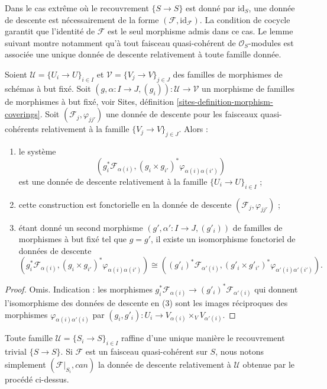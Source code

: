 \medskip\noindent
Dans le cas extrême où le recouvrement $\{S \to S\}$ est donné par
$\text{id}_S$, une donnée de descente est nécessairement de la forme
$(\mathcal{F}, \text{id}_\mathcal{F})$. La condition de cocycle garantit que
l'identité de $\mathcal{F}$ est le seul morphisme admis dans ce cas. Le lemme
suivant montre notamment qu'à tout faisceau quasi-cohérent de
$\mathcal{O}_S$-modules est associée une unique donnée de descente relativement
à toute famille donnée.

\begin{lemma}
\label{lemma-refine-descent-datum}
Soient $\mathcal{U} = \{U_i \to U\}_{i \in I}$ et
$\mathcal{V} = \{V_j \to V\}_{j \in J}$ des familles de morphismes de
schémas à but fixé. Soit
$(g, \alpha : I \to J, (g_i)) : \mathcal{U} \to \mathcal{V}$ un morphisme
de familles de morphismes à but fixé, voir Sites, définition
\ref{sites-definition-morphism-coverings}. Soit
$(\mathcal{F}_j, \varphi_{jj'})$ une donnée de descente pour les faisceaux
quasi-cohérents relativement à la famille $\{V_j \to V\}_{j \in J}$. Alors :
\begin{enumerate}
\item le système
$$
\left(g_i^*\mathcal{F}_{\alpha(i)},
(g_i \times g_{i'})^*\varphi_{\alpha(i)\alpha(i')}\right)
$$
est une donnée de descente relativement à la famille
$\{U_i \to U\}_{i \in I}$ ;
\item cette construction est
fonctorielle en la donnée de descente $(\mathcal{F}_j, \varphi_{jj'})$ ;
\item étant donné un second morphisme
$(g', \alpha' : I \to J, (g'_i))$ de familles de morphismes à but fixé tel
que $g = g'$, il existe un isomorphisme fonctoriel de données de descente
$$
(g_i^*\mathcal{F}_{\alpha(i)},
(g_i \times g_{i'})^*\varphi_{\alpha(i)\alpha(i')})
\cong
((g'_i)^*\mathcal{F}_{\alpha'(i)},
(g'_i \times g'_{i'})^*\varphi_{\alpha'(i)\alpha'(i')}).
$$
\end{enumerate}
\end{lemma}

\begin{proof}
Omis. Indication : les morphismes
$g_i^*\mathcal{F}_{\alpha(i)} \to (g'_i)^*\mathcal{F}_{\alpha'(i)}$ qui
donnent l'isomorphisme des données de descente en (3) sont les images
réciproques des morphismes $\varphi_{\alpha(i)\alpha'(i)}$ par
$(g_i, g'_i) : U_i \to V_{\alpha(i)} \times_V V_{\alpha'(i)}$.
\end{proof}

\noindent
Toute famille $\mathcal{U} = \{S_i \to S\}_{i \in I}$ raffine d'une unique
manière le recouvrement trivial $\{S \to S\}$. Si $\mathcal{F}$ est un
faisceau quasi-cohérent sur $S$, nous notons simplement
$(\mathcal{F}|_{S_i}, can)$ la donnée de descente relativement à
$\mathcal{U}$ obtenue par le procédé ci-dessus.

